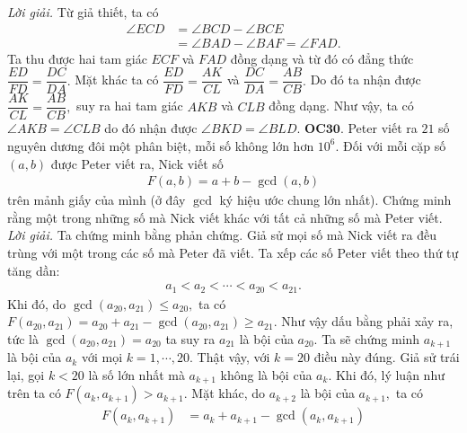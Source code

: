 \begin{multicols}{2}
\begin{figure}[H]
		\vspace*{-5pt}
	\end{figure}
	\textit{Lời giải.}
	Từ giả thiết, ta có
	\begin{align*}
		\angle ECD&= \angle BCD - \angle BCE \\
		&= \angle BAD - \angle BAF = \angle FAD.
	\end{align*}
	Ta thu được hai tam giác $ECF$ và $FAD$ đồng dạng và từ đó có đẳng thức $\dfrac{ED}{FD} = \dfrac{DC}{DA}.$ Mặt khác ta có $\dfrac{ED}{FD} = \dfrac{AK}{CL}$ và $\dfrac{DC}{DA}=\dfrac{AB}{CB}.$ Do đó ta nhận được $\dfrac{AK}{CL}=\dfrac{AB}{CB},$  suy ra hai tam giác $AKB$ và $CLB$ đồng dạng. 
	\vskip 0.1cm
	Như vậy, ta có $\angle AKB=\angle CLB$ do đó nhận được   $\angle BKD = \angle BLD.$
	\vskip 0.1cm
	{\bf\color{cackithi} OC$\pmb{30.}$} Peter viết ra $21$ số nguyên dương đôi một phân biệt, mỗi số không lớn hơn $10^6$. Đối với mỗi cặp số $(a, b)$ được Peter viết ra, Nick  viết  số
	\begin{align*}
		F(a, b) = a + b - \gcd (a, b)
	\end{align*}
	trên mảnh giấy của mình (ở đây $\gcd$ ký hiệu ước chung lớn nhất). 
	\vskip 0.1cm
	Chứng minh rằng một trong những số mà Nick viết khác với tất cả những  số mà Peter viết. 
	\vskip 0.1cm
	\textit{Lời giải.} Ta chứng minh bằng phản chứng. Giả sử mọi số mà Nick viết ra đều trùng với một trong các số mà Peter đã viết. Ta xếp các số Peter viết theo thứ tự tăng dần:
	\begin{align*}
		a_1 < a_2 < \cdots < a_{20} < a_{21}.
	\end{align*}
	Khi đó, do $\gcd (a_{20}, a_{21}) \le a_{20},$ ta có  $F(a_{20}, a_{21}) = a_{20} + a_{21} - \gcd (a_{20}, a_{21})\ge a_{21}.$ Như vậy dấu bằng phải xảy ra, tức là $\gcd (a_{20}, a_{21}) = a_{20}$ ta suy ra $a_{21}$ là bội của $a_{20}.$
	\vskip 0.1cm
	Ta sẽ chứng minh $a_{k+1}$ là bội của $a_k$ với mọi $k=1, \cdots, 20.$ Thật vậy, với $k=20$ điều này đúng. Giả sử trái lại, gọi $k<20$ là số lớn nhất mà $a_{k+1}$ không là bội của $a_k.$ Khi đó, lý luận như trên ta có $F(a_{k}, a_{k+1})>a_{k+1}$. Mặt khác, do $a_{k+2}$ là bội của $a_{k+1},$ ta có 
	\begin{align*}
		F(a_{k}, a_{k+1}) &= a_{k} + a_{k+1} - \gcd (a_{k}, a_{k+1})\\

\end{align*}
\end{multicols}
